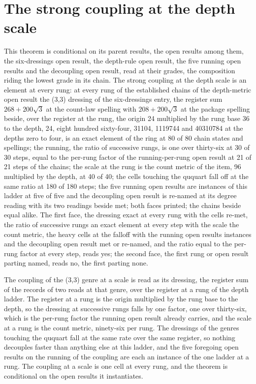 \section{The strong coupling at the depth scale}\label{mod:VII-2-D543568-scds-t1}
\begin{chconditional}\label{box:VII-2-D543568-scds-t1:1}
This theorem is conditional on its parent results, the open results among them, the six-dressings open result, the depth-rule open result, the five running open results and the decoupling open result, read at their grades, the composition riding the lowest grade in its chain. The strong coupling at the depth scale is an element at every rung: at every rung of the established chains of the depth-metric open result the (3,3) dressing of the six-dressings entry, the register sum $268 + 200\sqrt{3}$ at the count-law spelling with $208 + 200\sqrt{3}$ at the package spelling beside, over the register at the rung, the origin 24 multiplied by the rung base 36 to the depth, 24, eight hundred sixty-four, 31104, 1119744 and 40310784 at the depths zero to four, is an exact element of the ring at 80 of 80 chain states and spellings; the running, the ratio of successive rungs, is one over thirty-six at 30 of 30 steps, equal to the per-rung factor of the running-per-rung open result at 21 of 21 steps of the chains; the scale at the rung is the count metric of the item, 96 multiplied by the depth, at 40 of 40; the cells touching the ququart fall off at the same ratio at 180 of 180 steps; the five running open results are instances of this ladder at five of five and the decoupling open result is re-named at its degree reading with its two readings beside met; both faces printed; the chains beside equal alike.
The first face, the dressing exact at every rung with the cells re-met, the ratio of successive rungs an exact element at every step with the scale the count metric, the heavy cells at the falloff with the running open results instances and the decoupling open result met or re-named, and the ratio equal to the per-rung factor at every step, reads yes; the second face, the first rung or open result parting named, reads no, the first parting none.
\end{chconditional}
The coupling of the (3,3) genre at a scale is read as its dressing, the register sum of the records of two reads at that genre, over the register at a rung of the depth ladder. The register at a rung is the origin multiplied by the rung base to the depth, so the dressing at successive rungs falls by one factor, one over thirty-six, which is the per-rung factor the running open result already carries, and the scale at a rung is the count metric, ninety-six per rung. The dressings of the genres touching the ququart fall at the same rate over the same register, so nothing decouples faster than anything else at this ladder, and the five foregoing open results on the running of the coupling are each an instance of the one ladder at a rung. The coupling at a scale is one cell at every rung, and the theorem is conditional on the open results it instantiates.
